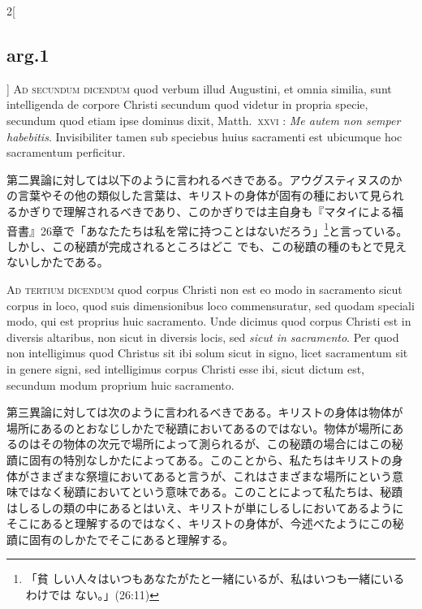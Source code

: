 \documentclass[paper=a4paper,fontsize=10pt,jafontsize=9pt,titlepage]{jlreq}
\begin{document}
\begin{paracol}{2}[\subsection{arg.1}]
{\scshape Ad secundum dicendum} quod verbum illud Augustini, et omnia
similia, sunt intelligenda de corpore Christi secundum quod videtur in
propria specie, secundum quod etiam ipse dominus dixit,
Matth.~{\scshape xxvi} : {\itshape Me autem non semper
habebitis}. Invisibiliter tamen sub speciebus huius sacramenti est
ubicumque hoc sacramentum perficitur.

\switchcolumn

第二異論に対しては以下のように言われるべきである。アウグスティヌスのか
の言葉やその他の類似した言葉は、キリストの身体が固有の種において見られ
るかぎりで理解されるべきであり、このかぎりでは主自身も『マタイによる福
音書』26章で「あなたたちは私を常に持つことはないだろう」\footnote{「貧
しい人々はいつもあなたがたと一緒にいるが、私はいつも一緒にいるわけでは
ない。」(26:11)}と言っている。しかし、この秘蹟が完成されるところはどこ
でも、この秘蹟の種のもとで見えないしかたである。

\switchcolumn*[\subsection{ad.3}]

{\scshape Ad tertium dicendum} quod corpus Christi non est eo modo in
sacramento sicut corpus in loco, quod suis dimensionibus loco
commensuratur, sed quodam speciali modo, qui est proprius huic
sacramento. Unde dicimus quod corpus Christi est in diversis
altaribus, non sicut in diversis locis, sed {\itshape sicut in
sacramento}. Per quod non intelligimus quod Christus sit ibi solum
sicut in signo, licet sacramentum sit in genere signi, sed
intelligimus corpus Christi esse ibi, sicut dictum est, secundum modum
proprium huic sacramento.

\switchcolumn

第三異論に対しては次のように言われるべきである。キリストの身体は物体が
場所にあるのとおなじしかたで秘蹟においてあるのではない。物体が場所にあ
るのはその物体の次元で場所によって測られるが、この秘蹟の場合にはこの秘
蹟に固有の特別なしかたによってある。このことから、私たちはキリストの身
体がさまざまな祭壇においてあると言うが、これはさまざまな場所にという意
味ではなく秘蹟においてという意味である。このことによって私たちは、秘蹟
はしるしの類の中にあるとはいえ、キリストが単にしるしにおいてあるように
そこにあると理解するのではなく、キリストの身体が、今述べたようにこの秘
蹟に固有のしかたでそこにあると理解する。

\switchcolumn*[\subsection{ad.4}]


\end{paracol}
\end{document}
